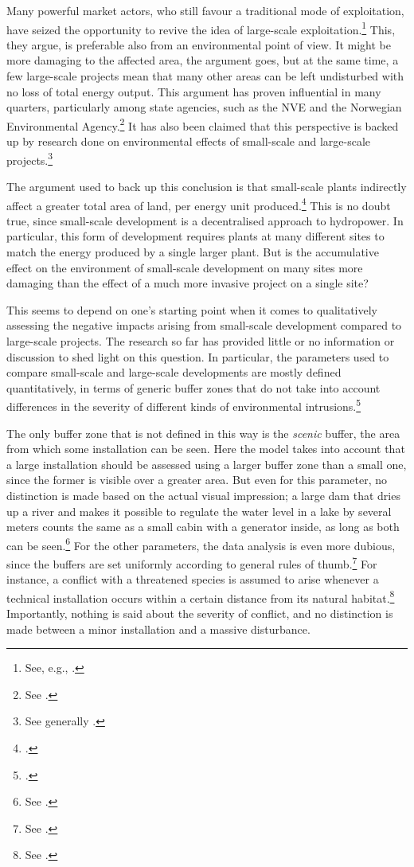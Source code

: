 Many powerful market actors, who still favour a traditional mode of exploitation, have seized the opportunity to revive the idea of large-scale exploitation.\footnote{See, e.g., \cite{alexandersen14}.} This, they argue, is preferable also from an environmental point of view. It might be more damaging to the affected area, the argument goes, but at the same time, a few large-scale projects mean that many other areas can be left undisturbed with no loss of total energy output. This argument has proven influential in many quarters, particularly among state agencies, such as the NVE and the Norwegian Environmental Agency.\footnote{See \cite{nilsen11}.} It has also been claimed that this perspective is backed up by research done on environmental effects of small-scale and large-scale projects.\footnote{See generally \cite{bakken12,bakken14}.} 

The argument used to back up this conclusion is that small-scale plants indirectly affect a greater total area of land, per energy unit produced.\footcite[96-99]{bakken14} This is no doubt true, since small-scale development is a decentralised approach to hydropower. In particular, this form of  development requires plants at many different sites to match the energy produced by a single larger plant. But is the accumulative effect on the environment of small-scale development on many sites more damaging than the effect of a much more invasive project on a single site?

This seems to depend on one's starting point when it comes to qualitatively assessing the negative impacts arising from small-scale development compared to large-scale projects. The research so far has provided little or no information or discussion to shed light on this question. In particular, the parameters used to compare small-scale and large-scale developments are mostly defined quantitatively, in terms of generic buffer zones that do not take into account differences in the severity of different kinds of environmental intrusions.\footcite[95]{bakken14}

The only buffer zone that is not defined in this way is the {\it scenic} buffer, the area from which some installation can be seen. Here the model takes into account that a large installation should be assessed using a larger buffer zone than a small one, since the former is visible over a greater area. But even for this parameter, no distinction is made based on the actual visual impression; a large dam that dries up a river and makes it possible to regulate the water level in a lake by several meters counts the same as a small cabin with a generator inside, as long as both can be seen.\footnote{See \cite[95]{bakken14}.} For the other parameters, the data analysis is even more dubious, since the buffers are set uniformly according to general rules of thumb.\footnote{See \cite[95]{bakken14}.} For instance, a conflict with a threatened species is assumed to arise whenever a technical installation occurs within a certain distance from its natural habitat.\footnote{See \cite[95]{bakken14}.} Importantly, nothing is said about the severity of conflict, and no distinction is made between a minor installation and a massive disturbance.

